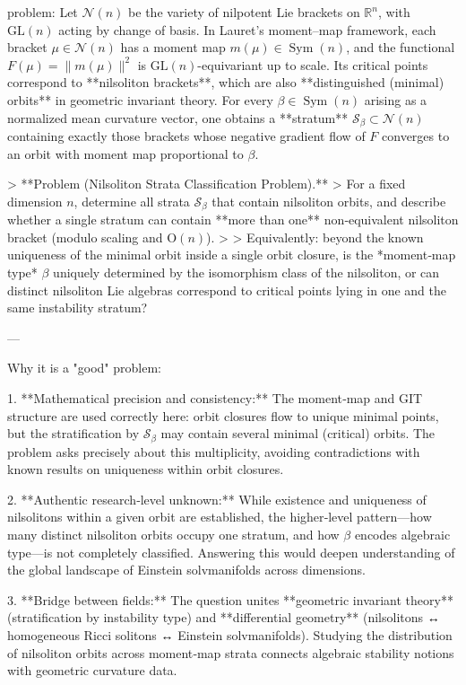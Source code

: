 problem:  
Let \( \mathcal{N}(n) \) be the variety of nilpotent Lie brackets on \( \mathbb{R}^n \), with \( \mathrm{GL}(n) \) acting by change of basis.  In Lauret’s moment–map framework, each bracket \( \mu\in\mathcal{N}(n) \) has a moment map \(m(\mu)\in\operatorname{Sym}(n)\), and the functional \(F(\mu)=\|m(\mu)\|^2\) is \( \mathrm{GL}(n)\)-equivariant up to scale.  Its critical points correspond to **nilsoliton brackets**, which are also **distinguished (minimal) orbits** in geometric invariant theory.  
For every \(\beta\in\operatorname{Sym}(n)\) arising as a normalized mean curvature vector, one obtains a **stratum** \(\mathcal{S}_\beta\subset\mathcal{N}(n)\) containing exactly those brackets whose negative gradient flow of \(F\) converges to an orbit with moment map proportional to \(\beta\).

> **Problem (Nilsoliton Strata Classification Problem).**  
> For a fixed dimension \(n\), determine all strata \(\mathcal{S}_\beta\) that contain nilsoliton orbits, and describe whether a single stratum can contain **more than one** non‑equivalent nilsoliton bracket (modulo scaling and \(\mathrm{O}(n)\)).  
>  
> Equivalently: beyond the known uniqueness of the minimal orbit inside a single orbit closure, is the *moment‑map type* \(\beta\) uniquely determined by the isomorphism class of the nilsoliton, or can distinct nilsoliton Lie algebras correspond to critical points lying in one and the same instability stratum?

---

Why it is a "good" problem:  

1. **Mathematical precision and consistency:**  
   The moment‑map and GIT structure are used correctly here: orbit closures flow to unique minimal points, but the stratification by \(\mathcal{S}_\beta\) may contain several minimal (critical) orbits.  The problem asks precisely about this multiplicity, avoiding contradictions with known results on uniqueness within orbit closures.

2. **Authentic research‑level unknown:**  
   While existence and uniqueness of nilsolitons within a given orbit are established, the higher‑level pattern—how many distinct nilsoliton orbits occupy one stratum, and how \(\beta\) encodes algebraic type—is not completely classified.  Answering this would deepen understanding of the global landscape of Einstein solvmanifolds across dimensions.

3. **Bridge between fields:**  
   The question unites **geometric invariant theory** (stratification by instability type) and **differential geometry** (nilsolitons ↔ homogeneous Ricci solitons ↔ Einstein solvmanifolds).  Studying the distribution of nilsoliton orbits across moment‑map strata connects algebraic stability notions with geometric curvature data.

